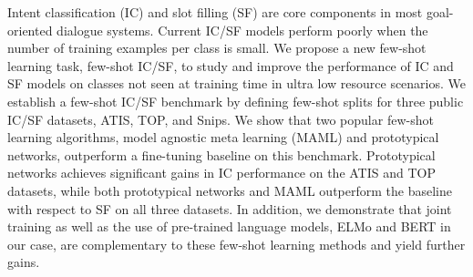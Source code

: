 Intent classification (IC) and slot filling (SF) are core components in most goal-oriented dialogue systems. Current IC/SF models perform poorly when the number of training examples per class is small. We propose a new few-shot learning task, few-shot IC/SF, to study and improve the performance of IC and SF models on classes not seen at training time in ultra low resource scenarios. We establish a few-shot IC/SF benchmark by defining few-shot splits for three public IC/SF datasets, ATIS, TOP, and Snips. We show that two popular few-shot learning algorithms, model agnostic meta learning (MAML) and prototypical networks, outperform a fine-tuning baseline on this benchmark. Prototypical networks achieves significant gains in IC performance on the ATIS and TOP datasets, while both prototypical networks and MAML outperform the baseline with respect to SF on all three datasets. In addition, we demonstrate that joint training as well as the use of pre-trained language models, ELMo and BERT in our case, are complementary to these few-shot learning methods and yield further gains.
